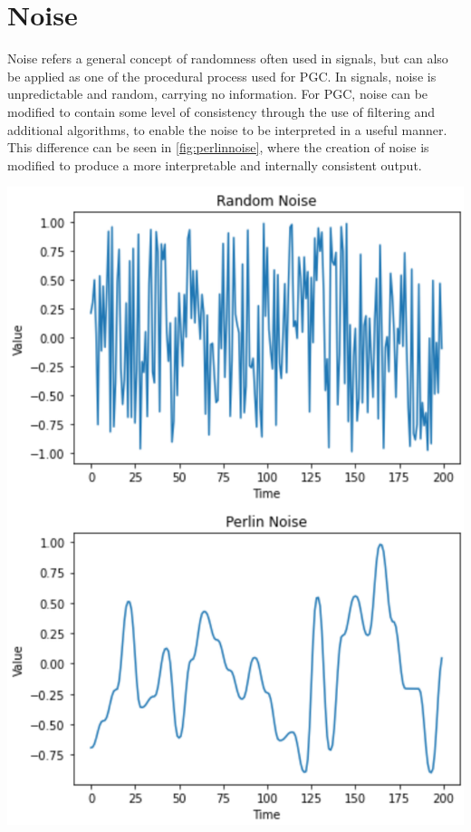 \documentclass[10pt]{report}
\begin{document}
	\vspace{10pt}
	\let\clearpage\relax
	\chapter{Noise}
		Noise refers a general concept of randomness often used in signals, but can also be applied as one of the procedural process used for PGC. In signals, noise is unpredictable and random, carrying no information. For PGC, noise can be modified to contain some level of consistency through the use of filtering and additional algorithms, to enable the noise to be interpreted in a useful manner. This difference can be seen in \autoref{fig:perlinnoise}, where the creation of noise is modified to produce a more interpretable and internally consistent output. 
		
		\begin{minipage}{\textwidth}
			\centering
			\includegraphics[scale=0.3]{perlinnoise}
			\label{fig:perlinnoise}
		\end{minipage}
	
\end{document}
